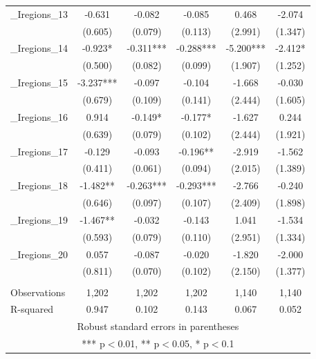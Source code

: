 \documentclass[]{article}
\begin{document}
\begin{tabular}{lccccc}
\_Iregions\_13 & -0.631 & -0.082 & -0.085 & 0.468 & -2.074 \\
 & (0.605) & (0.079) & (0.113) & (2.991) & (1.347) \\
\_Iregions\_14 & -0.923* & -0.311*** & -0.288*** & -5.200*** & -2.412* \\
 & (0.500) & (0.082) & (0.099) & (1.907) & (1.252) \\
\_Iregions\_15 & -3.237*** & -0.097 & -0.104 & -1.668 & -0.030 \\
 & (0.679) & (0.109) & (0.141) & (2.444) & (1.605) \\
\_Iregions\_16 & 0.914 & -0.149* & -0.177* & -1.627 & 0.244 \\
 & (0.639) & (0.079) & (0.102) & (2.444) & (1.921) \\
\_Iregions\_17 & -0.129 & -0.093 & -0.196** & -2.919 & -1.562 \\
 & (0.411) & (0.061) & (0.094) & (2.015) & (1.389) \\
\_Iregions\_18 & -1.482** & -0.263*** & -0.293*** & -2.766 & -0.240 \\
 & (0.646) & (0.097) & (0.107) & (2.409) & (1.898) \\
\_Iregions\_19 & -1.467** & -0.032 & -0.143 & 1.041 & -1.534 \\
 & (0.593) & (0.079) & (0.110) & (2.951) & (1.334) \\
\_Iregions\_20 & 0.057 & -0.087 & -0.020 & -1.820 & -2.000 \\
 & (0.811) & (0.070) & (0.102) & (2.150) & (1.377) \\
 &  &  &  &  &  \\
Observations & 1,202 & 1,202 & 1,202 & 1,140 & 1,140 \\
 R-squared & 0.947 & 0.102 & 0.143 & 0.067 & 0.052 \\ \hline
\multicolumn{6}{c}{ Robust standard errors in parentheses} \\
\multicolumn{6}{c}{ *** p$<$0.01, ** p$<$0.05, * p$<$0.1} \\
\end{tabular}
\end{document}
